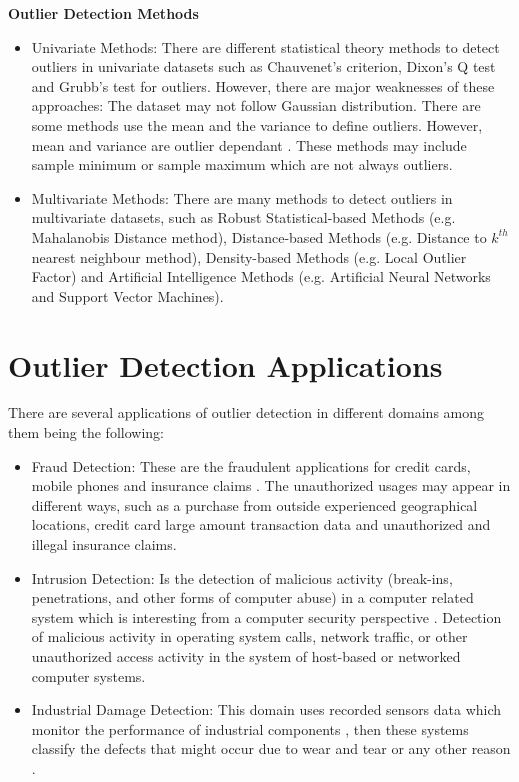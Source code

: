 \textbf{Outlier Detection Methods}
\begin{itemize}
\item{Univariate Methods:}
There are different statistical theory methods to detect outliers in univariate datasets such as Chauvenet's criterion, Dixon's Q test and Grubb's test for outliers. However, there are major weaknesses of these approaches: The dataset may not follow Gaussian distribution. There are some methods use the mean and the variance to define outliers. However, mean and variance are outlier dependant \citep{Songwon}. These methods may include sample minimum or sample maximum which are not always outliers.
\item{Multivariate Methods:}
There are many methods to detect outliers in multivariate datasets, such as Robust Statistical-based Methods (e.g. Mahalanobis Distance method), Distance-based Methods (e.g. Distance to $k^{th}$ nearest neighbour method), Density-based Methods (e.g. Local Outlier Factor) and Artificial Intelligence Methods (e.g. Artificial Neural Networks and Support Vector Machines).
\end{itemize}

\section{Outlier Detection Applications}
There are several applications of outlier detection in different domains among them being the following:
\begin{itemize}
\item{Fraud Detection:} 
These are the fraudulent applications for credit cards, mobile phones and insurance claims \citep{Kurukshetra}. The unauthorized usages may appear in different ways, such as a purchase from outside experienced geographical locations, credit card large amount transaction data and unauthorized and illegal insurance claims. %
\item{Intrusion Detection:} 
Is the detection of malicious activity (break-ins, penetrations, and other forms of computer abuse) in a computer related system which is interesting from a computer security perspective \citep{Survey}.
Detection of malicious activity in operating system calls, network traffic, or other unauthorized access activity in the system of host-based or networked computer systems.
\item{Industrial Damage Detection:}
This domain uses recorded sensors data which monitor the performance of industrial components \citep{Kurukshetra}, then these systems classify the defects that might occur due to wear and tear or any other reason \citep{Survey}.
\end{itemize}
